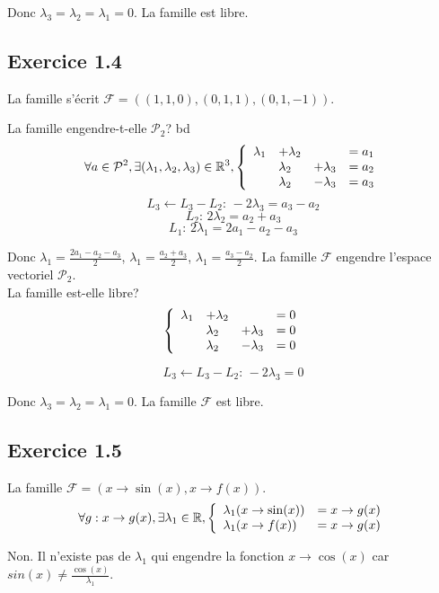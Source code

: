 \documentclass[]{book}
\theoremstyle{definition}
\newcommand{\bb}[1]{\mathbb{#1}}
\newcommand{\R}{\bb{R}}
\begin{document}
Donc $\lambda_3 = \lambda_2 = \lambda_1 = 0$. La famille est libre.

\subsection*{Exercice 1.4}
La famille s'\'ecrit $\mathcal{F} = ((1,1,0),(0,1,1),(0,1,-1))$.

La famille engendre-t-elle $\mathcal{P}_2$?
bd
$$ \forall a \in \mathcal{P}^2, \exists (\lambda_1,\lambda_2,\lambda_3) \in \R^3,
\left\{ 
\begin{array}{l l l l}
  \lambda_1 & +\lambda_2 &               & = a_1 \\
            & \lambda_2  & +\lambda_3   & = a_2 \\
            & \lambda_2  & -\lambda_3   & = a_3 \\
\end{array}
\right. 
$$
$$L_3 \leftarrow L_3-L_2:\, -2\lambda_3 = a_3-a_2$$
$$L_2:\, 2\lambda_2 = a_2+a_3$$
$$L_1:\, 2\lambda_1 = 2a_1-a_2-a_3$$

Donc $\lambda_1 = \frac{2a_1-a_2-a_3}{2}$, $\lambda_1 = \frac{a_2+a_3}{2}$, $\lambda_1 = \frac{a_3-a_2}{2}$. La famille $\mathcal{F}$ engendre l'espace vectoriel $\mathcal{P}_2$.\\

\medskip
La famille est-elle libre?
$$
\left\{ 
\begin{array}{l l l l}
  \lambda_1 & +\lambda_2 &               & = 0 \\
            & \lambda_2  & +\lambda_3   & = 0 \\
            & \lambda_2  & -\lambda_3   & = 0 \\
\end{array}
\right. 
$$

$$L_3 \leftarrow L_3-L_2:\, -2\lambda_3 = 0$$

Donc $\lambda_3 = \lambda_2 = \lambda_1 = 0$. La famille $\mathcal{F}$ est libre.

\subsection*{Exercice 1.5}
La famille $\mathcal{F} = (x \to \sin(x),x \to f(x))$.
$$
\forall g: x \to g(x), \exists \lambda_1 \in \R,
\left\{ 
\begin{array}{l l}
  \lambda_1(x \to \sin(x)) & = x \to g(x) \\
  \lambda_1(x \to f(x))    & = x \to g(x) \\
\end{array}
\right. 
$$

Non. Il n'existe pas de $\lambda_1$ qui engendre la fonction $x \to \cos(x)$ car $sin(x) \neq \frac{\cos(x)}{\lambda_1}$.
\end{document}
